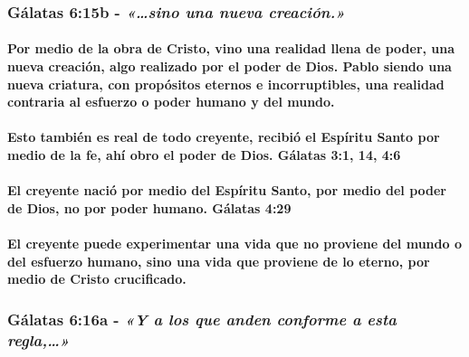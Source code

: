 \documentclass[11a pt,twoside]{article}
\newcommand{\scripture}[1]{%
  {\fontsize{12pt}{16pt}\selectfont\ScriptureFont\itshape #1}%
}
\let\oldsubsubsection\subsubsection
\renewcommand{\subsubsection}{\needspace{4\baselineskip}\oldsubsubsection}
\let\oldparagraph\paragraph
\renewcommand{\paragraph}{\needspace{3\baselineskip}\oldparagraph}
\begin{document}
\subsubsection{\texorpdfstring{Gálatas 6:15b -
\scripture{«…sino una nueva creación.»}}{Gálatas 6:15b - }}\label{guxe1latas-615b---sino-una-nueva-creaciuxf3n.}

\paragraph{Por medio de la obra de Cristo, vino una realidad llena de
poder, una nueva creación, algo realizado por el poder de Dios. Pablo
siendo una nueva criatura, con propósitos eternos e incorruptibles, una
realidad contraria al esfuerzo o poder humano y del
mundo.}\label{por-medio-de-la-obra-de-cristo-vino-una-realidad-llena-de-poder-una-nueva-creaciuxf3n-algo-realizado-por-el-poder-de-dios.-pablo-siendo-una-nueva-criatura-con-propuxf3sitos-eternos-e-incorruptibles-una-realidad-contraria-al-esfuerzo-o-poder-humano-y-del-mundo.}

\paragraph{Esto también es real de todo creyente, recibió el Espíritu
Santo por medio de la fe, ahí obro el poder de Dios. Gálatas 3:1, 14,
4:6}\label{esto-tambiuxe9n-es-real-de-todo-creyente-recibiuxf3-el-espuxedritu-santo-por-medio-de-la-fe-ahuxed-obro-el-poder-de-dios.-guxe1latas-31-14-46}

\paragraph{El creyente nació por medio del Espíritu Santo, por medio del
poder de Dios, no por poder humano. Gálatas
4:29}\label{el-creyente-naciuxf3-por-medio-del-espuxedritu-santo-por-medio-del-poder-de-dios-no-por-poder-humano.-guxe1latas-429}

\paragraph{El creyente puede experimentar una vida que no proviene del
mundo o del esfuerzo humano, sino una vida que proviene de lo eterno,
por medio de Cristo
crucificado.}\label{el-creyente-puede-experimentar-una-vida-que-no-proviene-del-mundo-o-del-esfuerzo-humano-sino-una-vida-que-proviene-de-lo-eterno-por-medio-de-cristo-crucificado.}

\subsubsection{\texorpdfstring{Gálatas 6:16a -
\scripture{«Y a los que anden conforme a esta regla,…»}}{Gálatas 6:16a - }}\label{guxe1latas-616a---y-a-los-que-anden-conforme-a-esta-regla}
\end{document}
